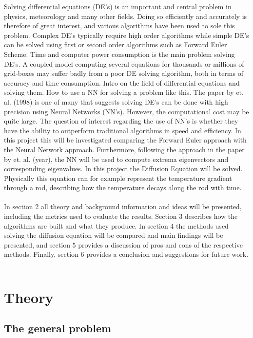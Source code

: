 \documentclass[a4paper,11pt,twocolumn]{article}
\begin{document}
Solving differential equations (DE's) is an important and central problem in physics, meteorology and many other fields. Doing so efficiently and accurately is therefore of great interest, and various algorithms have been used to sole this problem. Complex DE's typically require high order algorithms while simple DE's can be solved using first or second order algorithms such as Forward Euler Scheme. Time and computer power consumption is the main problem solving DE's. A coupled model computing several equations for thousands or millions of grid-boxes may suffer badly from a poor DE solving algorithm, both in terms of accuracy and time consumption.  
Intro on the field of differential equations and solving them. How to use a NN for solving a problem like this. The paper by \cite{lagaris} et. al. (1998) is one of many that suggests solving DE's can be done with high precision using Neural Networks (NN's). However, the computational cost may be quite large. 
The question of interest regarding the use of NN's is whether they have the ability to outperform traditional algorithms in speed and efficiency. In this project this will be investigated comparing the Forward Euler approach with the Neural Network approach. Furthermore, following the approach in the paper by \cite{yi} et. al. (year), the NN will be used to compute extrema eigenvectors and corresponding eigenvalues. In this project the Diffusion Equation will be solved. Physically this equation can for example represent the temperature gradient through a rod, describing how the temperature decays along the rod with time.  
\\
\\
In section 2 all theory and background information and ideas will be presented, including the metrics used to evaluate the results. Section 3 describes how the algorithms are built and what they produce. In section 4 the methods used solving the diffusion equation will be compared and main findings will be presented, and section 5 provides a discussion of pros and cons of the respective methods. Finally, section 6 provides a conclusion and suggestions for future work.   
\
\section{Theory}

\subsection{The general problem}
\end{document}
